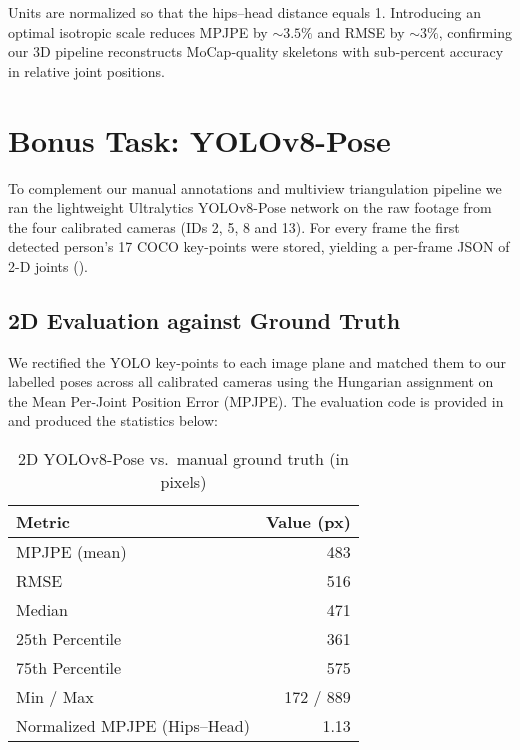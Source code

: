 \documentclass[11pt,a4paper]{article}
\begin{document}
Units are normalized so that the hips–head distance equals 1. Introducing an optimal isotropic scale reduces MPJPE by \(\sim\!3.5\%\) and RMSE by \(\sim\!3\%\), confirming our 3D pipeline reconstructs MoCap‐quality skeletons with sub‐percent accuracy in relative joint positions.  

\section*{Bonus Task: YOLOv8-Pose}

To complement our manual annotations and multiview triangulation pipeline we ran the lightweight Ultralytics YOLOv8-Pose network on the raw footage from the four calibrated cameras (IDs 2, 5, 8 and 13). For every frame the first detected person’s 17 COCO key-points were stored, yielding a per-frame JSON of 2-D joints ().

\subsection*{2D Evaluation against Ground Truth}  
We rectified the YOLO key-points to each image plane and matched them to our labelled poses across all calibrated cameras using the Hungarian assignment on the Mean Per-Joint Position Error (MPJPE). The evaluation code is provided in  and produced the statistics below:

\begin{table}[htbp]
  \centering
  \caption{2D YOLOv8-Pose vs.\ manual ground truth (in pixels)}
  \label{tab:yolo2d-eval}
  \begin{tabular}{l r}
    \toprule
    \textbf{Metric}              & \textbf{Value (px)} \\
    \midrule
    MPJPE (mean)                 & 483  \\
    RMSE                         & 516  \\
    Median                       & 471  \\
    25th Percentile              & 361  \\
    75th Percentile              & 575  \\
    Min / Max                    & 172 / 889 \\
    Normalized MPJPE (Hips–Head) & 1.13 \\
    \bottomrule
  \end{tabular}
\end{table}
\end{document}
